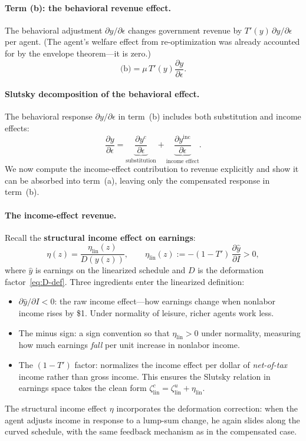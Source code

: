 \documentclass[12pt,a4paper]{article}
\theoremstyle{definition}
\theoremstyle{plain}
\theoremstyle{remark}
\begin{document}
\paragraph{Term (b): the behavioral revenue effect.}
The behavioral adjustment $\partial y/\partial\epsilon$ changes
government revenue by $T'(y)\,\partial y/\partial\epsilon$
per agent. (The agent's welfare effect from re-optimization
was already accounted for by the envelope theorem---it is zero.)
\begin{equation}
\label{eq:term-b-1D}
\text{(b)} = \mu\,T'(y)\frac{\partial y}{\partial\epsilon}.
\end{equation}

\paragraph{Slutsky decomposition of the behavioral effect.}
The behavioral response $\partial y/\partial\epsilon$ in
term~(b) includes both substitution and income effects:
\[
\frac{\partial y}{\partial\epsilon}
=
\underbrace{\frac{\partial y^c}{\partial\epsilon}}_{\text{substitution}}
+
\underbrace{\frac{\partial y^{\text{inc}}}{\partial\epsilon}}_{\text{income effect}}.
\]
We now compute the income-effect contribution to revenue
explicitly and show it can be absorbed into term~(a), leaving
only the compensated response in term~(b).

\paragraph{The income-effect revenue.}
Recall the \textbf{structural income effect on earnings}:
\[
  \eta(z) = \frac{\eta_{\mathrm{lin}}(z)}{D(y(z))},
  \qquad
  \eta_{\mathrm{lin}}(z) := -(1-T')\,\frac{\partial \hat y}{\partial I} > 0,
\]
where $\hat y$ is earnings on the linearized schedule and $D$ is the deformation factor~\eqref{eq:D-def}. Three ingredients enter the linearized definition:
\begin{itemize}[leftmargin=2em]
  \item $\partial \hat y/\partial I < 0$: the raw income effect---how earnings change when nonlabor income rises by \$1. Under normality of leisure, richer agents work less.
  \item The minus sign: a sign convention so that $\eta_{\mathrm{lin}} > 0$ under normality, measuring how much earnings \emph{fall} per unit increase in nonlabor income.
  \item The $(1-T')$ factor: normalizes the income effect per dollar of \emph{net-of-tax} income rather than gross income. This ensures the Slutsky relation in earnings space takes the clean form $\zeta^c_{\mathrm{lin}} = \zeta^u_{\mathrm{lin}} + \eta_{\mathrm{lin}}$.
\end{itemize}
The structural income effect $\eta$ incorporates the deformation correction: when the agent adjusts income in response to a lump-sum change, he again slides along the curved schedule, with the same feedback mechanism as in the compensated case.
\end{document}
